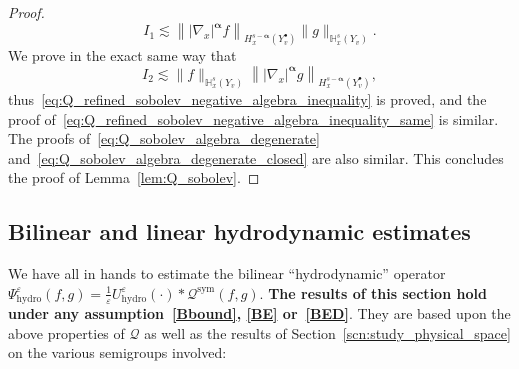 \documentclass[AHL,Unicode,longabstracts,published]{cedram}
\newcommand{\hyd}{\mathrm{hydro}}
\newcommand{\sym}{\mathrm{sym}}
\newcommand{\bbH}{\mathbb{H}}
\newcommand{\QQ}{\mathcal{Q}}
\newcommand{\Sg}{Y}
\newcommand{\Sgp}{Y^{\bullet}}
\newcommand*\eps{{\varepsilon}}
\begin{document}
\begin{proof}
\[
I_1 \lesssim \left\| | \nabla_x |^{\boldsymbol{\alpha}} f \right\|_{ H^{ s-\boldsymbol{\alpha} }_x \left(\Sgp_v \right) } \| g \|_{ \bbH^s_x \left(\Sg_v \right) }.
\]
We prove in the exact same way that
\[
I_2 \lesssim \| f \|_{ \bbH^s_x \left(\Sg_v \right) } \left\| | \nabla_x |^{\boldsymbol{\alpha}} g \right\|_{ H^{ s-\boldsymbol{\alpha} }_x \left(\Sgp_v \right) },
\]
thus~\eqref{eq:Q_refined_sobolev_negative_algebra_inequality} is proved, and the proof of~\eqref{eq:Q_refined_sobolev_negative_algebra_inequality_same} is similar. The proofs of~\eqref{eq:Q_sobolev_algebra_degenerate} and~\eqref{eq:Q_sobolev_algebra_degenerate_closed} are also similar. This concludes the proof of Lemma~\ref{lem:Q_sobolev}.
\end{proof}

\subsection{Bilinear and linear hydrodynamic estimates}

We have all in hands to estimate the bilinear ``hydrodynamic'' operator $\Psi^\eps_\hyd(f,g)=\frac{1}{\eps}U_\hyd^\eps(\cdot) \ast \QQ^\sym(f,g)$. \textbf{The results of this section hold under any assumption~\eqref{Bbound}, \eqref{BE} or~\eqref{BED}}. They are based upon the above properties of $\QQ$ as well as the results of Section~\ref{scn:study_physical_space} on the various semigroups involved:
\end{document}
